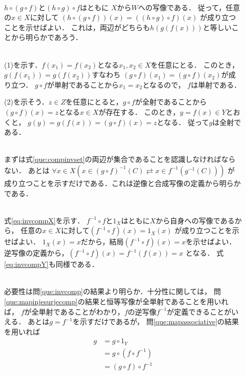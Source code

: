 \begin{description}
\item[] \mbox{} \\
  $h \circ ( g \circ f)$と$(h \circ g ) \circ f$はともに
  $X$から$W$への写像である．
  従って，任意の$x \in X$に対して
  $(h \circ ( g \circ f))(x) = ((h \circ g) \circ f) (x)$
  が成り立つことを示せばよい．
  これは，両辺がどちらも$h(g(f(x)))$と等しいことから明らかであろう．
\item[] \mbox{} \\
  (1)を示す．$f(x_1)=f(x_2)$となる$x_1 ,  x_2 \in X$を任意にとる．
  このとき，$g(f(x_1))=g(f(x_2))$すなわち
  $(g \circ f)(x_1) = (g \circ f)(x_2)$が成り立つ．
  $g \circ f$が単射であることから$x_1 =x_2$となるので，
  $f$は単射である．

  (2)を示そう．$z \in Z$を任意にとると，$g \circ f$が全射であることから
  $(g \circ f)(x)=z$となる$x \in X$が存在する．
  このとき，$y = f(x) \in Y$とおくと，
  $g(y) = g(f(x)) = (g \circ f)(x) =z$となる．
  従って$g$は全射である．
\item[] \mbox{} \\
  まずは式\eqref{que:compinvset}の両辺が集合であることを認識しなければならない．
  あとは
  $\forall x \in X(
  x \in (g \circ f)^{-1}(C) \rightleftarrows x \in f^{-1}(g^{-1}(C)))$
  が成り立つことを示すだけである．これは逆像と合成写像の定義から明らかである．
\item[] \mbox{} \\
  式\eqref{eq:invcompX}を示す．
  $f^{-1} \circ f$と$1_X$はともに$X$から自身への写像であるから，
  任意の$x \in X$に対して$(f^{-1} \circ f)(x) = 1_X(x) $
  が成り立つことを示せばよい．
  $1_X(x)=x$だから，結局$(f^{-1} \circ f)(x) = x$を示せばよい．
  逆写像の定義から，$(f^{-1} \circ f)(x) = f^{-1}(f(x)) = x$
  となる．
  式\eqref{eq:invcompY}も同様である．
\item[] \mbox{} \\
  必要性は問\ref{que:invcomp}の結果より明らか．十分性に関しては，
  問\ref{que:mapinjesurjecomp}の結果と恒等写像が全単射であることを用いれば，
  $f$が全単射であることがわかり，$f$の逆写像$f^{-1}$が定義できることがいえる．
  あとは$g=f^{-1}$を示すだけであるが，
  問\ref{que:mapassociative}の結果を用いれば
  \begin{align*}
    g & = g \circ 1_Y \\
      & = g \circ ( f \circ f^{-1} ) \\
      & = ( g \circ f) \circ f^{-1} \\

\end{align*}
\end{description}
